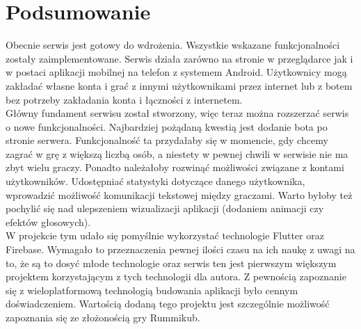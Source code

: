 \chapter*{Podsumowanie}
\thispagestyle{chapterBeginStyle}

Obecnie serwis jest gotowy do wdrożenia. Wszystkie wskazane funkcjonalności zostały zaimplementowane. Serwis działa zarówno na stronie w przeglądarce jak i w postaci aplikacji mobilnej na telefon z systemem Android. Użytkownicy mogą zakładać własne konta i grać z innymi użytkownikami przez internet lub z botem bez potrzeby zakładania konta i łączności z internetem. \\

Główny fundament serwisu został stworzony, więc teraz można rozszerzać serwis o nowe funkcjonalności. Najbardziej pożądaną kwestią jest dodanie bota po stronie serwera. Funkcjonalność ta przydałaby się w momencie, gdy chcemy zagrać w grę z większą liczbą osób, a niestety w pewnej chwili w serwisie nie ma zbyt wielu graczy. Ponadto należałoby rozwinąć możliwości związane z kontami użytkowników. Udostępniać statystyki dotyczące danego użytkownika, wprowadzić możliwość komunikacji tekstowej między graczami. Warto byłoby też pochylić się nad ulepszeniem wizualizacji aplikacji (dodaniem animacji czy efektów głosowych). \\

W projekcie tym udało się pomyślnie wykorzystać technologie Flutter oraz Firebase. Wymagało to przeznaczenia pewnej ilości czasu na ich naukę z uwagi na to, że są to dosyć młode technologie oraz serwis ten jest pierwszym większym projektem korzystającym z tych technologii dla autora. Z pewnością zapoznanie się z wieloplatformową technologią budowania aplikacji było cennym doświadczeniem. Wartością dodaną tego projektu jest szczególnie możliwość zapoznania się ze złożonością gry Rummikub.